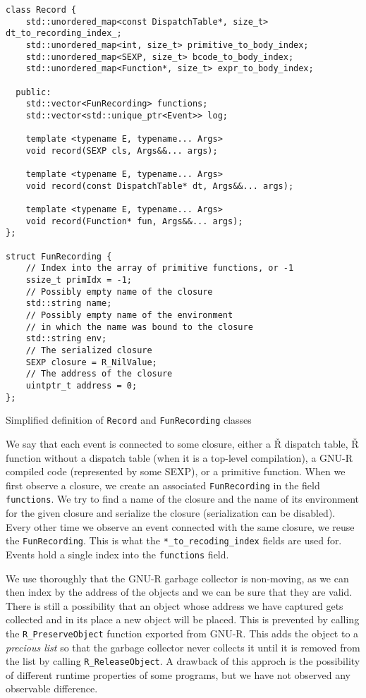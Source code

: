\begin{listing}
	\begin{verbatim}
class Record {
    std::unordered_map<const DispatchTable*, size_t> dt_to_recording_index_;
    std::unordered_map<int, size_t> primitive_to_body_index;
    std::unordered_map<SEXP, size_t> bcode_to_body_index;
    std::unordered_map<Function*, size_t> expr_to_body_index;

  public:
    std::vector<FunRecording> functions;
    std::vector<std::unique_ptr<Event>> log;

    template <typename E, typename... Args>
    void record(SEXP cls, Args&&... args);

    template <typename E, typename... Args>
    void record(const DispatchTable* dt, Args&&... args);

    template <typename E, typename... Args>
    void record(Function* fun, Args&&... args);
};

struct FunRecording {
    // Index into the array of primitive functions, or -1
    ssize_t primIdx = -1;
    // Possibly empty name of the closure
    std::string name;
    // Possibly empty name of the environment
    // in which the name was bound to the closure
    std::string env;
    // The serialized closure
    SEXP closure = R_NilValue;
    // The address of the closure
    uintptr_t address = 0;
};
  \end{verbatim}
	\caption{Simplified definition of \texttt{Record} and \texttt{FunRecording} classes }\label{lst:record-class}
\end{listing}

We say that each event is connected to some closure, either a Ř dispatch table, Ř function without a dispatch table (when it is a top-level compilation), a GNU-R compiled code (represented by some SEXP), or a primitive function. When we first observe a closure, we create an associated \texttt{FunRecording} in the field \texttt{functions}. We try to find a name of the closure and the name of its environment for the given closure and serialize the closure (serialization can be disabled). Every other time we observe an event connected with the same closure, we reuse the \texttt{FunRecording}. This is what the \texttt{*\_to\_recoding\_index} fields are used for. Events hold a single index into the \texttt{functions} field.

We use thoroughly that the GNU-R garbage collector is non-moving, as we can then index by the address of the objects and we can be sure that they are valid. There is still a possibility that an object whose address we have captured gets collected and in its place a new object will be placed. This is prevented by calling the \texttt{R\_PreserveObject} function exported from GNU-R. This adds the object to a \textit{precious list} so that the garbage collector never collects it until it is removed from the list by calling \texttt{R\_ReleaseObject}. A drawback of this approch is the possibility of different runtime properties of some programs, but we have not observed any observable difference.

